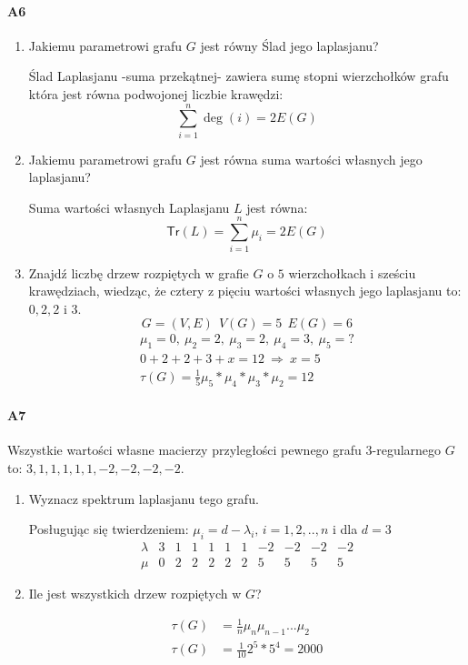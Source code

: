 \documentclass[a4paper,12pt]{article}
\theoremstyle{definition}%
\theoremstyle{definition}
\theoremstyle{problem}
\begin{document}
\paragraph{A6}
\begin{enumerate}[label=\alph*)]
\item Jakiemu parametrowi grafu $G$ jest równy Ślad jego laplasjanu?

Ślad Laplasjanu -suma przekątnej- zawiera sumę stopni wierzchołków grafu która jest równa podwojonej liczbie krawędzi: $$\sum _{i=1}^n\deg (i)=2E(G)$$ 
\item Jakiemu parametrowi grafu $G$ jest równa suma wartości własnych jego laplasjanu?

Suma wartości własnych Laplasjanu $L$ jest równa:
$$\mathsf{Tr}(L)=\sum _{i=1}^n \mu _i=2E(G)$$
\item Znajdź liczbę drzew rozpiętych w grafie $G$ o $5$ wierzchołkach i sześciu krawędziach, wiedząc, że cztery z pięciu wartości własnych jego laplasjanu to: $0, 2, 2$ i $3$.
$$G=(V,E)\ \ V(G)=5\ \ E(G)=6$$
\begin{align*}
\mu _1=0,\ \mu _2=2,\ \mu _3=2,\ \mu _4=3,\ \mu _5=?\\
0+2+2+3+x=12\ \Rightarrow \ x=5\\
\tau (G)=\frac{1}{5}\mu _5*\mu _4*\mu_3*\mu_2 = 12
\end{align*}
\end{enumerate}

\paragraph{A7} Wszystkie wartości własne macierzy przyległości pewnego grafu $3$-regularnego $G$ to: $3, 1, 1, 1, 1, 1, -2,-2,-2,-2$.
\begin{enumerate}[label=\alph*)]
\item Wyznacz spektrum laplasjanu tego grafu.

Posługując się twierdzeniem: $\mu _i=d-\lambda _i,\, i=1,2,..,n$ i dla $d=3$
$$\begin{array}{l|cccccccccc}
\lambda & 3& 1& 1& 1& 1& 1& -2&-2&-2&-2\\\hline
\mu & 0&2&2&2&2&2&5&5&5&5
\end{array}$$
\item Ile jest wszystkich drzew rozpiętych w $G$?

\begin{align*}
\tau (G)&=\frac{1}{n}\mu_n \mu_{n-1}...\mu _2\\
\tau (G)&=\frac{1}{10}2^5*5^4=2000
\end{align*}
\end{enumerate}
\end{document}
